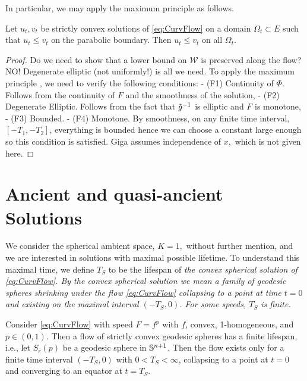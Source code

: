 \documentclass{amsart}
\begin{document}
In particular, we may apply the maximum principle \cite[Theorem 3.1.1]{Giga:2006} as follows.

\begin{thm}
\label{thm:comparison}
Let \(u_t, v_t\) be strictly convex solutions of \eqref{eq:CurvFlow} on a domain \(\Omega_t \subset E\) such that \(u_t \leq v_t\) on the parabolic boundary. Then \(u_t \leq v_t\) on all \(\Omega_t\).
\end{thm}

\begin{proof}
Do we need to show that a lower bound on \(\mathcal{W}\) is preserved along the flow? NO! Degenerate elliptic (not uniformly!) is all we need.
To apply the maximum principle \cite[Theorem 3.1.1]{Giga:2006}, we need to verify the following conditions:
- (F1) Continuity of \(\Phi\). Follows from the continuity of \(F\) and the smoothness of the solution,
- (F2) Degenerate Elliptic. Follows from the fact that \(\~g^{-1}\) is elliptic and \(F\) is monotone,
- (F3) Bounded.
- (F4) Monotone. By smoothness, on any finite time interval, \([-T_1, -T_2]\), everything is bounded hence we can choose a constant large enough so this condition is satisfied.
{\color{red} Giga assumes independence of $x,$ which is not given here.}
\end{proof}

\section{Ancient and quasi-ancient Solutions}
\label{sec:quasi_ancient}

We consider the spherical ambient space, $K=1,$ without further mention, and we are interested in solutions with maximal possible lifetime. To understand this maximal time, we define $T_S$ to be the lifespan of \it{the} convex spherical solution of \eqref{eq:CurvFlow}. By the convex spherical solution we mean a family of geodesic spheres shrinking under the flow \eqref{eq:CurvFlow} collapsing to a point at time $t=0$ and existing on the maximal interval \((-T_S, 0)\). For some speeds, \(T_S\) is finite.

\begin{lemma}
 Consider \eqref{eq:CurvFlow} with speed \(F = f^p\) with \(f\), convex, 1-homogeneous, and \(p \in (0,1)\). Then a flow of strictly convex geodesic spheres has a finite lifespan, i.e., let $S_r(p)$ be a geodesic sphere in $\S^{n+1}$. Then the flow exists only for a finite time interval \((-T_S,0)\) with \(0 < T_S < \infty\), collapsing to a point at \(t=0\) and converging to an equator at \(t=T_S\).
\end{lemma}
\end{document}
